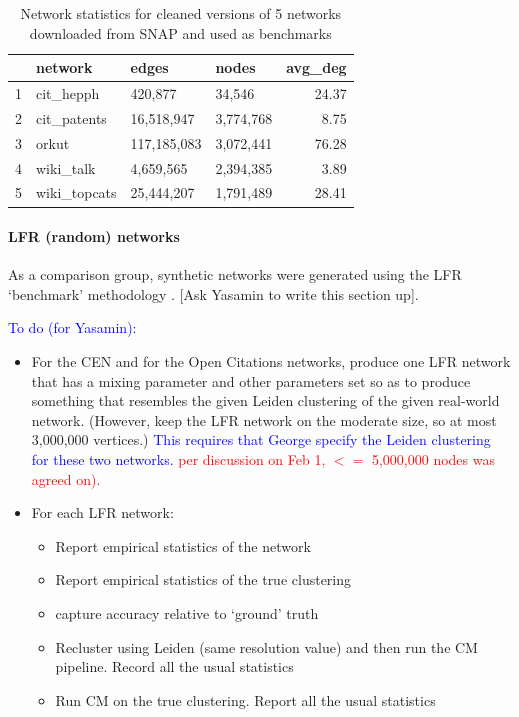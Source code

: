 \documentclass[12pt, oneside]{article}   	%
\begin{document}
\begin{table}[ht]
\centering
\begin{tabular}{rlllr}
  \hline
 & network & edges & nodes & avg\_deg \\ 
  \hline
  1 & cit\_hepph & 420,877 & 34,546 & 24.37 \\ 
  2 & cit\_patents & 16,518,947 & 3,774,768 & 8.75 \\ 
  3 & orkut & 117,185,083 & 3,072,441 & 76.28 \\ 
  4 & wiki\_talk & 4,659,565 & 2,394,385 & 3.89 \\ 
  5 & wiki\_topcats & 25,444,207 & 1,791,489 & 28.41 \\ 
   \hline
\end{tabular}
\caption{Network statistics for cleaned versions of 5 networks downloaded from SNAP and used as benchmarks}
\end{table}

\paragraph{LFR (random) networks}
As a comparison group, synthetic networks were generated using the LFR `benchmark' methodology \citep{Lancichinetti2008}. [Ask Yasamin to write this section up].

\textcolor{blue}{
To do (for Yasamin):}

\begin{itemize}
\item For  the CEN and  for the Open Citations networks, produce one LFR network  that has a mixing parameter and other
parameters set so as to produce something that resembles the given Leiden clustering of the given real-world network. (However, keep the LFR network
on the moderate size, so at most 3,000,000 vertices.)
\textcolor{blue}{This requires that George specify the Leiden clustering for these two networks.}  \textcolor{red}{per discussion on Feb 1, $<=$ 5,000,000 nodes was agreed on).}
\item 
For each LFR network: 
\begin{itemize}
\item Report empirical statistics of the network
\item Report empirical statistics of the true clustering 
\item capture accuracy relative to `ground' truth
\item 
Recluster using Leiden (same resolution value) and then run the CM pipeline.
Record all the usual statistics
\item Run CM on the true clustering.
Report all the usual statistics
\end{itemize}
\end{itemize}
\end{document}
